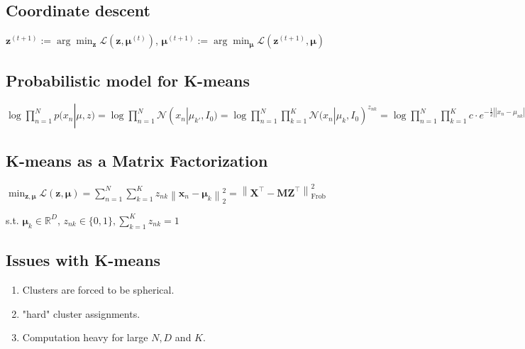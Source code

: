 \subsection*{Coordinate descent}

$\mathbf{z}^{(t+1)}:=\arg \min _{\boldsymbol{z}} \mathcal{L}\left(\mathbf{z}, \boldsymbol{\mu}^{(t)}\right)$,
$\boldsymbol{\mu}^{(t+1)}:=\arg \min _{\boldsymbol{\mu}} \mathcal{L}\left(\mathbf{z}^{(t+1)}, \boldsymbol{\mu}\right)$



\subsection*{Probabilistic model for K-means}

$
\log\prod_{n=1}^{N}p(x_{n}|\mu,z)=\log\prod_{n=1}^{N} \mathcal{N}(x_{n}|\mu_{k'},I_{0})
=\log\prod_{n=1}^{N}\prod_{k=1}^{K}\mathcal{N}(x_n|\mu_k,I_0)^{z_{nk}}
=\log\prod_{n=1}^{N}\prod_{k=1}^{K}c\cdot e^{-\frac 12\left||x_n-\mu_{nk}|\right|^2\cdot z_{nk}}=-\sum_{n=1}^{N}\sum_{k=1}^{K}\frac 12||x_n-\mu_k||^2 z_{nk}+c^{\prime}=-\mathcal{L}(\mu,z)$

\subsection*{K-means as a Matrix Factorization}

$\min _{\mathbf{z}, \boldsymbol{\mu}} \mathcal{L}(\mathbf{z}, \boldsymbol{\mu})  =\sum_{n=1}^{N} \sum_{k=1}^{K} z_{n k}\left\|\mathbf{x}_{n}-\boldsymbol{\mu}_{k}\right\|_{2}^{2} =\left\|\mathbf{X}^{\top}-\mathbf{M} \mathbf{Z}^{\top}\right\|_{\text {Frob }}^{2}$

s.t. $\boldsymbol{\mu}_{k} \in \mathbb{R}^{D}$,
$
z_{n k} \in\{0,1\}, \sum_{k=1}^{K} z_{n k}=1
$

\subsection*{Issues with K-means}
\begin{enumerate}

  \item Clusters are forced to be spherical.

  \item "hard" cluster assignments.
  \item Computation heavy for large $N, D$ and $K$.

\end{enumerate}
